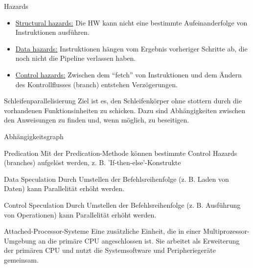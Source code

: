 \begin{defi}{Hazards}
    \begin{itemize}
        \item \underline{Structural hazards:}
              Die HW kann nicht eine bestimmte Aufeinanderfolge von Instruktionen ausführen.
        \item \underline{Data hazards:}
              Instruktionen hängen vom Ergebnis vorheriger Schritte ab, 
              die noch nicht die Pipeline verlassen haben.
        \item \underline{Control hazards:}
              Zwischen dem \enquote{fetch} von Instruktionen und dem Ändern des Kontrollflusses (branch) entstehen Verzögerungen.
    \end{itemize}
\end{defi}

\begin{defi}{Schleifenparallelisierung}
    Ziel ist es, 
    den Schleifenkörper ohne stottern durch die vorhandenen Funktionsinheiten zu schicken.
    Dazu sind Abhängigkeiten zwischen den Anweisungen zu finden und, 
    wenn möglich, zu beseitigen.
\end{defi}

\begin{defi}{Abhängigkeitsgraph}
    
\end{defi}

\begin{defi}{Predication}
    Mit der Predication-Methode können bestimmte Control Hazards (branches) aufgelöst werden, 
    z. B. 'If-then-else'-Konstrukte
\end{defi}

\begin{defi}{Data Speculation}
    Durch Umstellen der Befehlsreihenfolge (z. B. Laden von Daten) kann Parallelität erhöht werden.
\end{defi}

\begin{defi}{Control Speculation}
    Durch Umstellen der Befehlsreihenfolge (z. B. Ausführung von Operationen) kann Parallelität erhöht werden.
\end{defi}

\begin{defi}{Attached-Processor-Systeme}
    Eine zusätzliche Einheit, 
    die in einer Multiprozessor-Umgebung an die primäre CPU angeschlossen ist. 
    Sie arbeitet als Erweiterung der primären CPU und 
    nutzt die Systemsoftware und Peripheriegeräte gemeinsam.
\end{defi}